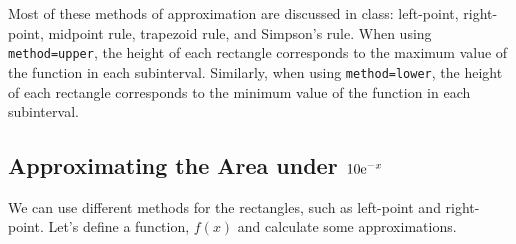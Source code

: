 Most of these methods of approximation are discussed in class: left-point, right-point, midpoint rule, trapezoid rule, and Simpson's rule. When using \texttt{method=upper}, the height of each rectangle corresponds to the maximum value of the function in each subinterval. Similarly, when using \texttt{method=lower}, the height of each rectangle corresponds to the minimum value of the function in each subinterval. 

\subsection{Approximating the Area under $10 {\rm e}^{-x}$}

We can use different methods for the rectangles, such as left-point and right-point. Let's define a function, $f(x)$ and calculate some approximations.


\begin{maplegroup}
\begin{mapleinput}
\end{mapleinput}
\mapleresult
\begin{maplelatex}
\end{maplelatex}
\end{maplegroup}

\begin{maplegroup}
\begin{mapleinput}
\end{mapleinput}
\mapleresult
\begin{maplelatex}
\end{maplelatex}
\mapleresult
\begin{maplelatex}
\end{maplelatex}
\end{maplegroup}

